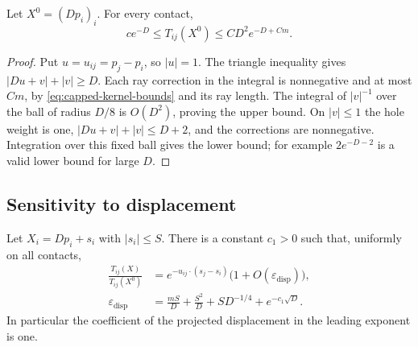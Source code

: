 \begin{lemma}
\label{lem:reference-hopping}
Let $X^0=(Dp_i)_i$.  For every contact,
\begin{equation}
 c e^{-D}\le T_{ij}(X^0)\le C D^2 e^{-D+Cm}.
 \label{eq:reference-hopping-bounds}
\end{equation}
\end{lemma}

\begin{proof}
Put $u=u_{ij}=p_j-p_i$, so $|u|=1$.  The triangle inequality
gives $|Du+v|+|v|\ge D$.  Each ray correction in the integral is
nonnegative and at most $Cm$, by \eqref{eq:capped-kernel-bounds}
and its ray length.  The integral of $|v|^{-1}$ over the ball of
radius $D/8$ is $O(D^2)$, proving the upper bound.  On $|v|\le1$
the hole weight is one, $|Du+v|+|v|\le D+2$, and the corrections
are nonnegative.  Integration over this fixed ball gives the lower
bound; for example $2e^{-D-2}$ is a valid lower bound for large $D$.
\end{proof}

\subsection{Sensitivity to displacement}

\begin{lemma}
\label{lem:hopping-displacement}
Let $X_i=Dp_i+s_i$ with $|s_i|\le S$.  There is a constant
$c_1>0$ such that, uniformly on all contacts,
\begin{align}
 \frac{T_{ij}(X)}{T_{ij}(X^0)}
  &=e^{-u_{ij}\cdot(s_j-s_i)}
     \bigl(1+O(\varepsilon_{\mathrm{disp}})\bigr),
     \label{eq:hopping-displacement-law}\\
 \varepsilon_{\mathrm{disp}}
  &=\frac{mS}{D}+\frac{S^2}{D}
      +S D^{-1/4}+e^{-c_1\sqrt D}.
     \label{eq:hopping-displacement-error}
\end{align}
In particular the coefficient of the projected displacement in the
leading exponent is one.
\end{lemma}

